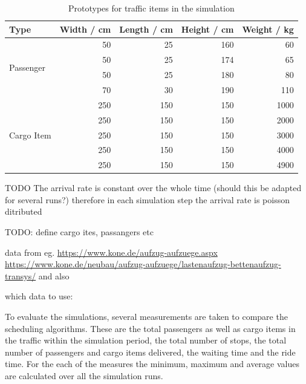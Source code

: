 \begin{table}[]
\centering
\begin{tabular}{lrrrr}
\textbf{Type}               & \textbf{Width / cm} & \textbf{Length / cm} & \textbf{Height / cm} & \textbf{Weight / kg} \\
\hline
\multirow{4}{*}{Passenger}  & 50                  & 25                   & 160                  & 60                   \\
                            & 50                  & 25                   & 174                  & 65                   \\
                            & 50                  & 25                   & 180                  & 80                   \\
                            & 70                  & 30                   & 190                  & 110                  \\
\hline
\multirow{5}{*}{Cargo Item} & 250                 & 150                  & 150                  & 1000                 \\
                            & 250                 & 150                  & 150                  & 2000                 \\
                            & 250                 & 150                  & 150                  & 3000                 \\
                            & 250                 & 150                  & 150                  & 4000                 \\
                            & 250                 & 150                  & 150                  & 4900                
\end{tabular}
\caption{\label{tab:design:trafficitemprototypes} Prototypes for traffic items in the simulation}
\end{table}

TODO
The arrival rate is constant over the whole time (should this be adapted for several runs?)
therefore in each simulation step the arrival rate is poisson ditributed

TODO: define cargo ites, passangers etc

data from eg. \url{https://www.kone.de/aufzug-aufzuege.aspx} \url{https://www.kone.de/neubau/aufzug-aufzuege/lastenaufzug-bettenaufzug-transys/}
and also \autocite[][p.~349]{barney2016handbook}

which data to use: \autocite[][p.~347]{barney2016handbook}


To evaluate the simulations, several measurements are taken to compare the scheduling algorithms.
These are the total passengers as well as cargo items in the traffic within the simulation period, the total number of stops, the total number of passengers and cargo items delivered, the waiting time and the ride time.  
For the each of the measures the minimum, maximum and average values are calculated over all the simulation runs.  


